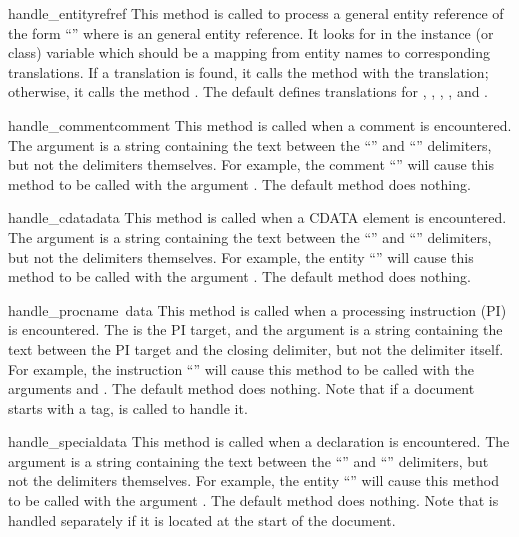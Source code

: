 \begin{funcdesc}{handle_entityref}{ref}
This method is called to process a general entity reference of the form
``'' where  is an general entity
reference.  It looks for  in the instance (or class)
variable  which should be a mapping from entity names
to corresponding translations.
If a translation is found, it calls the method 
with the translation; otherwise, it calls the method
.  The default 
defines translations for , , ,
, and .
\end{funcdesc}

\begin{funcdesc}{handle_comment}{comment}
This method is called when a comment is encountered.  The
 argument is a string containing the text between the
``\code{<!--}'' and ``\code{-->}'' delimiters, but not the delimiters
themselves.  For example, the comment ``'' will
cause this method to be called with the argument .  The
default method does nothing.
\end{funcdesc}

\begin{funcdesc}{handle_cdata}{data}
This method is called when a CDATA element is encountered.  The
 argument is a string containing the text between the
``\code{<![CDATA[}'' and ``\code{]]>}'' delimiters, but not the delimiters
themselves.  For example, the entity ``\code{<![CDATA[text]]>}'' will
cause this method to be called with the argument .  The
default method does nothing.
\end{funcdesc}

\begin{funcdesc}{handle_proc}{name\, data}
This method is called when a processing instruction (PI) is encountered.  The
 is the PI target, and the  argument is a
string containing the text between the PI target and the closing delimiter,
but not the delimiter itself.  For example, the instruction
``'' will cause this method to be called with the
arguments  and .  The default method does
nothing.  Note that if a document starts with a 
tag,  is called to handle it.
\end{funcdesc}

\begin{funcdesc}{handle_special}{data}
This method is called when a declaration is encountered.  The
 argument is a string containing the text between the
``\code{<!}'' and ``\code{>}'' delimiters, but not the delimiters
themselves.  For example, the entity ``'' will
cause this method to be called with the argument .  The
default method does nothing.  Note that  is
handled separately if it is located at the start of the document.
\end{funcdesc}

